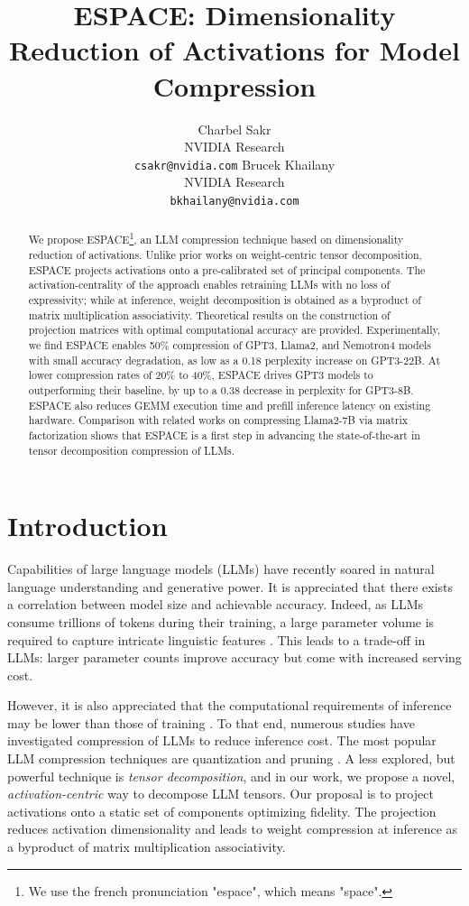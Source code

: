 \documentclass{article}
\title{ESPACE: Dimensionality Reduction of Activations for Model Compression}
\author{%
  Charbel Sakr \\
  NVIDIA Research\\
  \texttt{csakr@nvidia.com} 
  \And Brucek Khailany \\ NVIDIA Research \\ \texttt{bkhailany@nvidia.com}
}
\theoremstyle{plain}
\begin{document}
\maketitle


\begin{abstract}
We propose ESPACE\footnote{We use the french pronunciation "espace", which means "space".}, an LLM compression technique based on dimensionality reduction of activations. Unlike prior works on weight-centric tensor decomposition, ESPACE projects activations onto a pre-calibrated set of principal components. The activation-centrality of the approach enables retraining LLMs with no loss of expressivity; while at inference, weight decomposition is obtained as a byproduct of matrix multiplication associativity. Theoretical results on the construction of projection matrices with optimal computational accuracy are provided. Experimentally, we find ESPACE enables 50\% compression of GPT3, Llama2, {and Nemotron4} models with small accuracy degradation, as low as a 0.18 perplexity increase on GPT3-22B. At lower compression rates of 20\% to 40\%, ESPACE drives GPT3 models to outperforming their baseline, by up to a 0.38 decrease in perplexity for GPT3-8B. {ESPACE also reduces GEMM execution time and prefill inference latency on existing hardware.} Comparison with related works on compressing Llama2-7B via matrix factorization shows that ESPACE is a first step in advancing the state-of-the-art in tensor decomposition compression of LLMs.
\end{abstract}



\section{Introduction}
Capabilities of large language models (LLMs) have recently soared in natural language understanding and generative power. It is appreciated that there exists a correlation between model size and achievable accuracy. Indeed, as LLMs consume trillions of tokens during their training, a large parameter volume is required to capture intricate linguistic features \cite{xue2024repeat}. This leads to a trade-off in LLMs: larger parameter counts improve accuracy but come with increased serving cost.

However, it is also appreciated that the computational requirements of inference may be lower than those of training \cite{liu2024understanding}. To that end, numerous studies have investigated compression of LLMs to reduce inference cost. The most popular LLM compression techniques are quantization \cite{xiao2023smoothquant} and pruning \cite{frantar2023sparsegpt}. A less explored, but powerful technique is \textit{tensor decomposition}, and in our work, we propose a novel, \textit{activation-centric} way to decompose LLM tensors. Our proposal is to project activations onto a static set of components optimizing fidelity. The projection reduces activation dimensionality and leads to weight compression at inference as a byproduct of matrix multiplication associativity.
\end{document}

